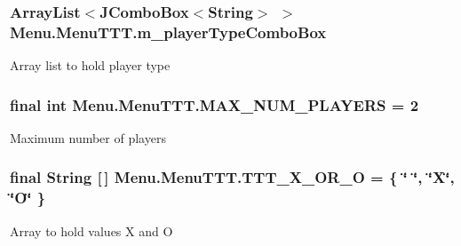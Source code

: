 \subsubsection[{m\+\_\+player\+Type\+Combo\+Box}]{\setlength{\rightskip}{0pt plus 5cm}Array\+List$<$J\+Combo\+Box$<$String$>$ $>$ Menu.\+Menu\+T\+T\+T.\+m\+\_\+player\+Type\+Combo\+Box\hspace{0.3cm}{\ttfamily [private]}}\label{class_menu_1_1_menu_t_t_t_a0d29323e5abc375ee10f1b27ecd6e1bd}
Array list to hold player type \hypertarget{class_menu_1_1_menu_t_t_t_a634a62eb8c913decb22f2b27ad64e2b6}{}
\subsubsection[{M\+A\+X\+\_\+\+N\+U\+M\+\_\+\+P\+L\+A\+Y\+E\+R\+S}]{\setlength{\rightskip}{0pt plus 5cm}final int Menu.\+Menu\+T\+T\+T.\+M\+A\+X\+\_\+\+N\+U\+M\+\_\+\+P\+L\+A\+Y\+E\+R\+S = 2\hspace{0.3cm}{\ttfamily [private]}}\label{class_menu_1_1_menu_t_t_t_a634a62eb8c913decb22f2b27ad64e2b6}
Maximum number of players \hypertarget{class_menu_1_1_menu_t_t_t_a05b9b5552eecd3dd9b969a21817f9789}{}
\subsubsection[{T\+T\+T\+\_\+\+X\+\_\+\+O\+R\+\_\+\+O}]{\setlength{\rightskip}{0pt plus 5cm}final String \mbox{[}$\,$\mbox{]} Menu.\+Menu\+T\+T\+T.\+T\+T\+T\+\_\+\+X\+\_\+\+O\+R\+\_\+\+O = \{ \char`\"{} \char`\"{}, \char`\"{}X\char`\"{}, \char`\"{}O\char`\"{} \}\hspace{0.3cm}{\ttfamily [private]}}\label{class_menu_1_1_menu_t_t_t_a05b9b5552eecd3dd9b969a21817f9789}
Array to hold values X and O \hypertarget{class_menu_1_1_menu_t_t_t_a611b82f2267f9ccb007b1ee5744e3088}{}
